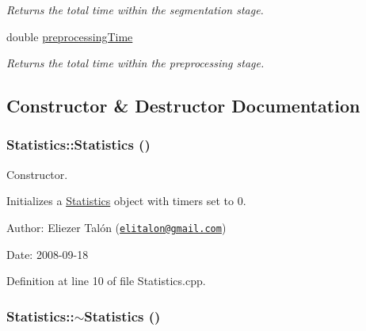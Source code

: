 \begin{CompactItemize}
\begin{CompactList}\small\item\em Returns the total time within the segmentation stage. \item\end{CompactList}\item 
\hypertarget{struct_statistics_57aa8970c666c415db6dcdd0cc3920f6}{
double \hyperlink{struct_statistics_57aa8970c666c415db6dcdd0cc3920f6}{preprocessingTime}}
\label{struct_statistics_57aa8970c666c415db6dcdd0cc3920f6}

\begin{CompactList}\small\item\em Returns the total time within the preprocessing stage. \item\end{CompactList}\end{CompactItemize}


\subsection{Constructor \& Destructor Documentation}
\hypertarget{struct_statistics_60ddd90a571ed4c3ce8c0f6317a36d63}{
\subsubsection[Statistics]{\setlength{\rightskip}{0pt plus 5cm}Statistics::Statistics ()}}
\label{struct_statistics_60ddd90a571ed4c3ce8c0f6317a36d63}


Constructor. 

Initializes a \hyperlink{struct_statistics}{Statistics} object with timers set to 0.

\begin{Desc}
\item[Author:]Eliezer Talón (\href{mailto:elitalon@gmail.com}{\tt elitalon@gmail.com}) \end{Desc}
\begin{Desc}
\item[Date:]2008-09-18 \end{Desc}


Definition at line 10 of file Statistics.cpp.\hypertarget{struct_statistics_b68ede75479e44d5c35b78ec1284065b}{
\subsubsection[$\sim$Statistics]{\setlength{\rightskip}{0pt plus 5cm}Statistics::$\sim$Statistics ()}}
\label{struct_statistics_b68ede75479e44d5c35b78ec1284065b}


